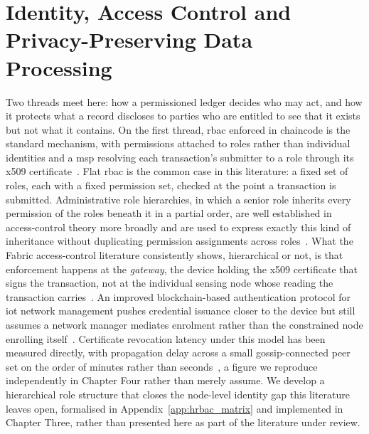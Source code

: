 \documentclass[12pt,a4paper,oneside]{book}
\begin{document}
\section{Identity, Access Control and Privacy-Preserving Data Processing}
\label{subsec:lit_privacy}

Two threads meet here: how a permissioned ledger decides who may act, and
how it protects what a record discloses to parties who are entitled to see
that it exists but not what it contains. On the first thread, \gls{rbac}
enforced in chaincode is the standard mechanism, with permissions attached
to roles rather than individual identities and a \gls{msp} resolving each
transaction's submitter to a role through its
\gls{x509} certificate~\cite{mdpiAccessControl, hyperledger2022msp}. Flat
\gls{rbac} is the common case in this literature: a fixed set of roles,
each with a fixed permission set, checked at the point a transaction is
submitted. Administrative role hierarchies, in which a senior role
inherits every permission of the roles beneath it in a partial order, are
well established in access-control theory more broadly and are used to
express exactly this kind of inheritance without duplicating permission
assignments across roles~\cite{lu2022revocation}. What the Fabric
access-control literature consistently shows, hierarchical or not, is that
enforcement happens at the \emph{gateway}, the device holding the
\gls{x509} certificate that signs the transaction, not at the individual
sensing node whose reading the transaction
carries~\cite{mdpiAccessControl, yavari2020blockchain}. An improved
blockchain-based authentication protocol for \gls{iot} network management
pushes credential issuance closer to the device but still assumes a
network manager mediates enrolment rather than the constrained node
enrolling itself~\cite{yavari2020blockchain}. Certificate revocation
latency under this model has been measured directly, with propagation
delay across a small gossip-connected peer set on the order of minutes
rather than seconds~\cite{lu2022revocation}, a figure we reproduce
independently in Chapter Four rather than merely assume. We develop a
hierarchical role structure that closes the node-level identity gap this
literature leaves open, formalised in Appendix~\ref{app:hrbac_matrix} and
implemented in Chapter Three, rather than presented here as part of the
literature under review.
\end{document}
